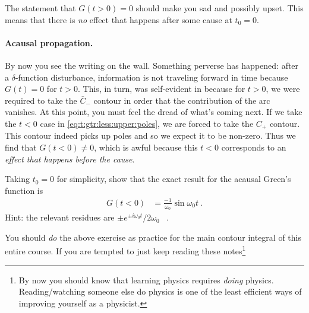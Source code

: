 \begin{example}
The statement that $G(t>0)=0$ should make you sad and possibly upset. This means that there is \emph{no} effect that happens after some cause at $t_0=0$.
\end{example}

\paragraph{Acausal propagation.} By now you see the writing on the wall. Something perverse has happened: after a $\delta$-function disturbance, information is not traveling forward in time because $G(t)=0$ for $t>0$. This, in turn, was self-evident in because for $t>0$, we were required to take the $\bar C_-$ contour in order that the contribution of the arc vanishes. At this point, you must feel the dread of what's coming next. If we take the $t<0$ case in \eqref{eq:t:gtr:less:upper:poles}, we are forced to take the $C_+$ contour. This contour indeed picks up poles and so we expect it to be non-zero. Thus we find that $G(t<0) \neq 0$, which is awful because this $t<0$ corresponds to an \emph{effect that happens before the cause}. 

\begin{exercise}
Taking $t_0=0$ for simplicity, show that the exact result for the acausal Green's function is
\begin{align}
	G(t<0) &= \frac{-1}{\omega_0}\sin\omega_0t \ .
	\label{eq:HO:G:t:less:0:nonzero}
\end{align}
Hint: the relevant residues are $\pm e^{\pm i\omega_0t}/2\omega_0$ \ .
\end{exercise}
You should \emph{do} the above exercise as practice for the main contour integral of this entire course. If you are tempted to just keep reading these notes\footnote{By now you should know that learning physics requires \emph{doing} physics. Reading/watching someone else do physics is one of the least efficient ways of improving yourself as a physicist.} 

